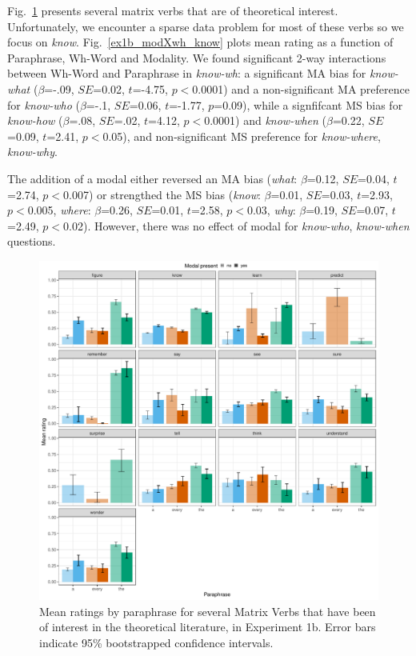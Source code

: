 \documentclass[12pt,letterpaper,table,svgnames,dvipsnames]{article}
\newcommand{\figref}[1]{Fig.~\ref{#1}}
\begin{document}
\figref{ex1b_matrix_verbs} presents several matrix verbs that are of theoretical interest. Unfortunately, we encounter a sparse data problem for most of these verbs so we focus on \emph{know}. \figref{ex1b_modXwh_know} plots mean rating as a function of Paraphrase, Wh-Word and Modality. We found significant 2-way interactions between Wh-Word and Paraphrase in \emph{know-wh}: a significant MA bias for \emph{know-what} ($\beta$=-.09, $SE$=0.02, $t$=-4.75, $p<$0.0001) and a non-significant MA preference for \emph{know-who} ($\beta$=-.1, $SE$=0.06, $t$=-1.77, $p$=0.09), while a signfifcant MS bias for \emph{know-how} ($\beta$=.08, $SE$=.02, $t$=4.12, $p<$0.0001) and \emph{know-when} ($\beta$=0.22, $SE$=0.09, $t$=2.41, $p<$0.05), and non-significant MS preference for \emph{know-where}, \emph{know-why}.

The addition of a modal either reversed an MA bias (\emph{what}: $\beta$=0.12, $SE$=0.04, $t$=2.74, $p<$0.007) or strengthed the MS bias (\emph{know}: $\beta$=0.01, $SE$=0.03, $t$=2.93, $p<$0.005, \emph{where}: $\beta$=0.26, $SE$=0.01, $t$=2.58, $p<$0.03, \emph{why}: $\beta$=0.19, $SE$=0.07, $t$=2.49, $p<$0.02). However, there was no effect of modal for \emph{know-who}, \emph{know-when} questions.

\begin{figure}[h!]
\centering
\includegraphics[scale=.6]{figures/matrixverbs_threotical_context.pdf}
\caption{Mean ratings by paraphrase for several Matrix Verbs that have been of interest in the theoretical literature, in Experiment 1b. Error bars indicate 95\% bootstrapped confidence intervals.} 
\label{ex1b_matrix_verbs}
\end{figure}
\end{document}
